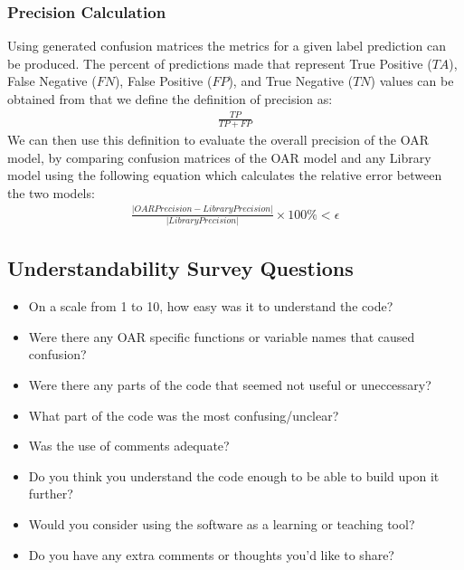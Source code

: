 \documentclass[12pt, titlepage]{article}
\begin{document}
\subsubsection{Precision Calculation} \label{precision_calc}

Using generated confusion matrices the metrics for a given label prediction can be produced. The percent of predictions made
that represent True Positive ($\mathit{TA}$), False Negative ($\mathit{FN}$), False Positive ($\mathit{FP}$), and True Negative ($\mathit{TN}$) values can be obtained 
from that we define the definition of precision as:
\begin{gather}
\frac{\mathit{TP}}{\mathit{TP} + \mathit{FP}}
\end{gather}
We can then use this definition to evaluate the overall precision of the OAR model, by comparing confusion matrices of the OAR model 
and any Library model using the following equation which calculates the relative error between the two models:
\begin{gather}
\frac{|\mathit{OAR Precision} - \mathit{Library Precision}|}{|\mathit{Library Precision}|} \times 100\% < \epsilon
\end{gather}
    
\subsection{Understandability Survey Questions} \label{survey_understand}

\begin{itemize}
  \item{On a scale from 1 to 10, how easy was it to understand the code?}
  \item{Were there any OAR specific functions or variable names that caused confusion?}
  \item{Were there any parts of the code that seemed not useful or uneccessary?}
  \item{What part of the code was the most confusing/unclear?}
  \item{Was the use of comments adequate?}
  \item{Do you think you understand the code enough to be able to build upon it further?}
  \item{Would you consider using the software as a learning or teaching tool?}
  \item{Do you have any extra comments or thoughts you'd like to share?}
\end{itemize}
\end{document}

